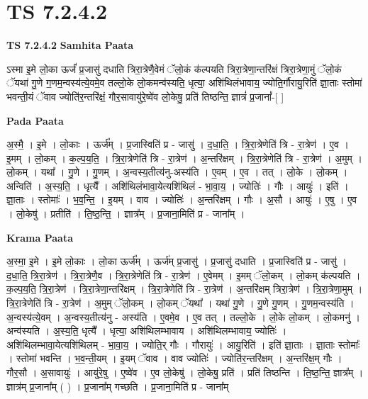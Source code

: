 \documentclass[17pt]{extarticle}
\begin{document}
\section{ TS 7.2.4.2 }

\textbf{TS 7.2.4.2 } \newline
\textbf{Samhita Paata} \newline

ऽस्मा इ॒मे लो॒का ऊर्जं॑ प्र॒जासु॑ दधाति त्रिरा॒त्रेणै॒वेमं ॅलो॒कं क॑ल्पयति त्रिरा॒त्रेणा॒न्तरि॑क्षं त्रिरा॒त्रेणा॒मुं ॅलो॒कं ॅयथा॑ गु॒णे ग॒णम॒न्वस्य॑त्ये॒वमे॒व तल्लो॒के लो॒कमन्व॑स्यति॒ धृत्या॒ अशि॑थिलंभावाय॒ ज्योति॒र्गौरायु॒रिति॑ ज्ञा॒ताः स्तोमा॑ भवन्ती॒यं ॅवाव ज्योति॑र॒न्तरि॑क्षं॒ गौर॒सावायु॑रे॒ष्वे॑व लो॒केषु॒ प्रति॑ तिष्ठन्ति॒ ज्ञात्रं॑ प्र॒जानां᳚-[  ] \newline

\textbf{Pada Paata} \newline

अ॒स्मै॒ । इ॒मे । लो॒काः । ऊर्ज᳚म् । प्र॒जास्विति॑ प्र - जासु॑ । द॒धा॒ति॒ । त्रि॒रा॒त्रेणेति॑ त्रि - रा॒त्रेण॑ । ए॒व । इ॒मम् । लो॒कम् । क॒ल्प॒य॒ति॒ । त्रि॒रा॒त्रेणेति॑ त्रि - रा॒त्रेण॑ । अ॒न्तरि॑क्षम् । त्रि॒रा॒त्रेणेति॑ त्रि - रा॒त्रेण॑ । अ॒मुम् । लो॒कम् । यथा᳚ । गु॒णे । गु॒णम् । अ॒न्वस्य॒तीत्य॑नु-अस्य॑ति । ए॒वम् । ए॒व । तत् । लो॒के । लो॒कम् । अन्विति॑ । अ॒स्य॒ति॒ । धृत्यै᳚ । अशि॑थिलंभावा॒येत्यशि॑थिलं - भा॒वा॒य॒ । ज्योतिः॑ । गौः । आयुः॑ । इति॑ । ज्ञा॒ताः । स्तोमाः᳚ । भ॒व॒न्ति॒ । इ॒यम् । वाव । ज्योतिः॑ । अ॒न्तरि॑क्षम् । गौः । अ॒सौ । आयुः॑ । ए॒षु । ए॒व । लो॒केषु॑ । प्रतीति॑ । ति॒ष्ठ॒न्ति॒ । ज्ञात्र᳚म् । प्र॒जाना॒मिति॑ प्र - जाना᳚म् ।  \newline


\textbf{Krama Paata} \newline

अ॒स्मा॒ इ॒मे । इ॒मे लो॒काः । लो॒का ऊर्ज᳚म् । ऊर्ज॑म् प्र॒जासु॑ । प्र॒जासु॑ दधाति । प्र॒जास्विति॑ प्र - जासु॑ । द॒धा॒ति॒ त्रि॒रा॒त्रेण॑ । त्रि॒रा॒त्रेणै॒व । त्रि॒रा॒त्रेणेति॑ त्रि - रा॒त्रेण॑ । ए॒वेमम् । इ॒मम् ॅलो॒कम् । लो॒कम् क॑ल्पयति । क॒ल्प॒य॒ति॒ त्रि॒रा॒त्रेण॑ । त्रि॒रा॒त्रेणा॒न्तरि॑क्षम् । त्रि॒रा॒त्रेणेति॑ त्रि - रा॒त्रेण॑ । अ॒न्तरि॑क्षम् त्रिरा॒त्रेण॑ । त्रि॒रा॒त्रेणा॒मुम् । त्रि॒रा॒त्रेणेति॑ त्रि - रा॒त्रेण॑ । अ॒मुम् ॅलो॒कम् । लो॒कम् ॅयथा᳚ । यथा॑ गु॒णे । गु॒णे गु॒णम् । गु॒णम॒न्वस्य॑ति । अ॒न्वस्य॑त्ये॒वम् । अ॒न्वस्य॒तीत्य॑नु - अस्य॑ति । ए॒वमे॒व । ए॒व तत् । तल्लो॒के । लो॒के लो॒कम् । लो॒कमनु॑ । अन्व॑स्यति । अ॒स्य॒ति॒ धृत्यै᳚ । धृत्या॒ अशि॑थिलम्भावाय । अशि॑थिलम्भावाय॒ ज्योतिः॑ । अशि॑थिलम्भावा॒येत्यशि॑थिलम् - भा॒वा॒य॒ । ज्योति॒र् गौः । गौरायुः॑ । आयु॒रिति॑ । इति॑ ज्ञा॒ताः । ज्ञा॒ताः स्तोमाः᳚ । स्तोमा॑ भवन्ति । भ॒व॒न्ती॒यम् । इ॒यम् ॅवाव । वाव ज्योतिः॑ । ज्योति॑र॒न्तरि॑क्षम् । अ॒न्तरि॑क्ष॒म् गौः । गौर॒सौ । अ॒सावायुः॑ । आयु॑रे॒षु । ए॒ष्वे॑व । ए॒व लो॒केषु॑ । लो॒केषु॒ प्रति॑ । प्रति॑ तिष्ठन्ति । ति॒ष्ठ॒न्ति॒ ज्ञात्र᳚म् । ज्ञात्र॑म् प्र॒जाना᳚म् ( ) । प्र॒जाना᳚म् गच्छति । प्र॒जाना॒मिति॑ प्र - जाना᳚म् \newline
\end{document}
